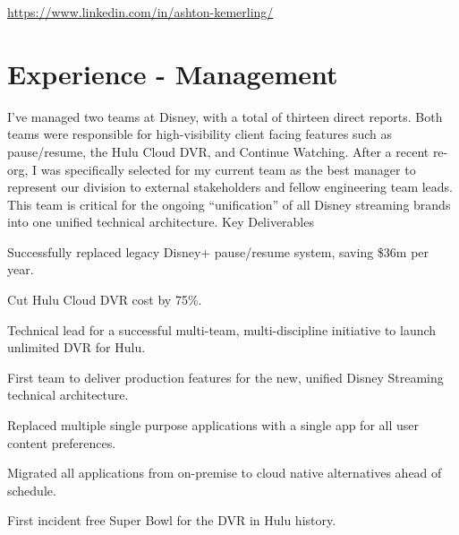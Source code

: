 \documentclass[]{deedy-resume-openfont}
\begin{document}
%
%
\lastupdated

%
%



\href{https://www.linkedin.com/in/ashton-kemerling/}{https://www.linkedin.com/in/ashton-kemerling/}

\begin{center}
\end{center}

\section{Experience - Management}

\vspace{\topsep} %
I've managed two teams at Disney, with a total of thirteen direct reports. Both teams were responsible for high-visibility client facing features such as pause/resume, the Hulu Cloud DVR, and Continue Watching. After a recent re-org, I was specifically selected for my current team as the best manager to represent our division to external stakeholders and fellow engineering team leads. This team is critical for the ongoing ``unification'' of all Disney streaming brands into one unified technical architecture.
\vspace{\topsep}
\newline
Key Deliverables
\begin{tightemize}
\item Successfully replaced legacy Disney+ pause/resume system, saving \$36m per year.
\item Cut Hulu Cloud DVR cost by 75\%.
\item Technical lead for a successful multi-team, multi-discipline initiative to launch unlimited DVR for Hulu.
\item First team to deliver production features for the new, unified Disney Streaming technical architecture.
\item Replaced multiple single purpose applications with a single app for all user content preferences.
\item Migrated all applications from on-premise to cloud native alternatives ahead of schedule.
\item First incident free Super Bowl for the DVR in Hulu history.
\end{tightemize}
\end{document}
